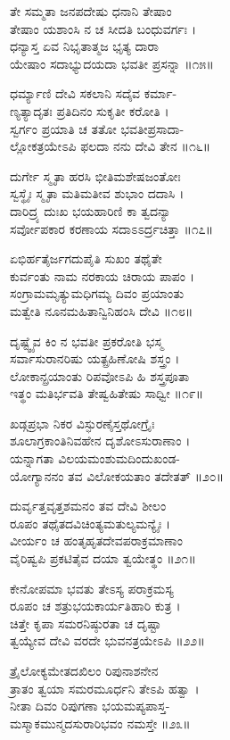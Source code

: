      ತೇ ಸಮ್ಮತಾ ಜನಪದೇಷು ಧನಾನಿ ತೇಷಾಂ\\
ತೇಷಾಂ ಯಶಾಂಸಿ ನ ಚ ಸೀದತಿ ಬಂಧುವರ್ಗಃ ।\\
     ಧನ್ಯಾಸ್ತ ಏವ ನಿಭೃತಾತ್ಮಜ ಭೃತ್ಯ ದಾರಾ\\
ಯೇಷಾಂ ಸದಾಭ್ಯುದಯದಾ ಭವತೀ ಪ್ರಸನ್ನಾ ॥೧೫॥

     ಧರ್ಮ್ಯಾಣಿ ದೇವಿ ಸಕಲಾನಿ ಸದೈವ ಕರ್ಮಾ-\\
ಣ್ಯತ್ಯಾದೃತಃ ಪ್ರತಿದಿನಂ ಸುಕೃತೀ ಕರೋತಿ ।\\
     ಸ್ವರ್ಗಂ ಪ್ರಯಾತಿ ಚ ತತೋ ಭವತೀಪ್ರಸಾದಾ-\\
ಲ್ಲೋಕತ್ರಯೇಽಪಿ ಫಲದಾ ನನು ದೇವಿ ತೇನ ॥೧೬॥

     ದುರ್ಗೇ ಸ್ಮೃತಾ ಹರಸಿ ಭೀತಿಮಶೇಷಜಂತೋಃ\\
ಸ್ವಸ್ಥೈಃ ಸ್ಮೃತಾ ಮತಿಮತೀವ ಶುಭಾಂ ದದಾಸಿ ।\\
     ದಾರಿದ್ರ್ಯ ದುಃಖ ಭಯಹಾರಿಣಿ ಕಾ ತ್ವದನ್ಯಾ\\
ಸರ್ವೋಪಕಾರ ಕರಣಾಯ ಸದಾಽಽರ್ದ್ರಚಿತ್ತಾ ॥೧೭॥

     ಏಭಿರ್ಹತೈರ್ಜಗದುಪೈತಿ ಸುಖಂ ತಥೈತೇ\\
ಕುರ್ವಂತು ನಾಮ ನರಕಾಯ ಚಿರಾಯ ಪಾಪಂ ।\\
     ಸಂಗ್ರಾಮಮೃತ್ಯುಮಧಿಗಮ್ಯ ದಿವಂ ಪ್ರಯಾಂತು\\
ಮತ್ವೇತಿ ನೂನಮಹಿತಾನ್ವಿನಿಹಂಸಿ ದೇವಿ ॥೧೮॥

     ದೃಷ್ಟ್ವೈವ ಕಿಂ ನ ಭವತೀ ಪ್ರಕರೋತಿ ಭಸ್ಮ\\
ಸರ್ವಾಸುರಾನರಿಷು ಯತ್ಪ್ರಹಿಣೋಷಿ ಶಸ್ತ್ರಂ ।\\
     ಲೋಕಾನ್ಪ್ರಯಾಂತು ರಿಪವೋಽಪಿ ಹಿ ಶಸ್ತ್ರಪೂತಾ\\
ಇತ್ಥಂ ಮತಿರ್ಭವತಿ ತೇಷ್ವಹಿತೇಷು ಸಾಧ್ವೀ ॥೧೯॥

     ಖಡ್ಗಪ್ರಭಾ ನಿಕರ ವಿಸ್ಫುರಣೈಸ್ತಥೋಗ್ರೈಃ\\
ಶೂಲಾಗ್ರಕಾಂತಿನಿವಹೇನ ದೃಶೋಽಸುರಾಣಾಂ ।\\
     ಯನ್ನಾಗತಾ ವಿಲಯಮಂಶುಮದಿಂದುಖಂಡ-\\
ಯೋಗ್ಯಾನನಂ ತವ ವಿಲೋಕಯತಾಂ ತದೇತತ್ ॥೨೦॥

     ದುರ್ವೃತ್ತವೃತ್ತಶಮನಂ ತವ ದೇವಿ ಶೀಲಂ\\
ರೂಪಂ ತಥೈತದವಿಚಿಂತ್ಯಮತುಲ್ಯಮನ್ಯೈಃ ।\\
     ವೀರ್ಯಂ ಚ ಹಂತೃಹೃತದೇವಪರಾಕ್ರಮಾಣಾಂ\\
ವೈರಿಷ್ವಪಿ ಪ್ರಕಟಿತೈವ ದಯಾ ತ್ವಯೇತ್ಥಂ ॥೨೧॥

     ಕೇನೋಪಮಾ ಭವತು ತೇಽಸ್ಯ ಪರಾಕ್ರಮಸ್ಯ\\
ರೂಪಂ ಚ ಶತ್ರುಭಯಕಾರ್ಯತಿಹಾರಿ ಕುತ್ರ ।\\
     ಚಿತ್ತೇ ಕೃಪಾ ಸಮರನಿಷ್ಠುರತಾ ಚ ದೃಷ್ಟಾ\\
ತ್ವಯ್ಯೇವ ದೇವಿ ವರದೇ ಭುವನತ್ರಯೇಽಪಿ ॥೨೨॥

     ತ್ರೈಲೋಕ್ಯಮೇತದಖಿಲಂ ರಿಪುನಾಶನೇನ\\
ತ್ರಾತಂ ತ್ವಯಾ ಸಮರಮೂರ್ಧನಿ ತೇಽಪಿ ಹತ್ವಾ ।\\
     ನೀತಾ ದಿವಂ ರಿಪುಗಣಾ ಭಯಮಪ್ಯಪಾಸ್ತ-\\
ಮಸ್ಮಾಕಮುನ್ಮದಸುರಾರಿಭವಂ ನಮಸ್ತೇ ॥೨೩॥

